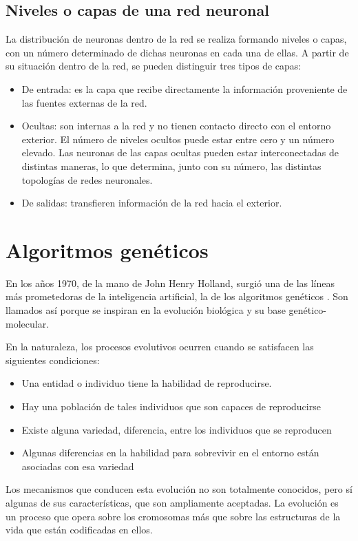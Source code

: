 \subsection{Niveles o capas de una red neuronal}
La distribución de neuronas dentro de la red se realiza formando niveles o
capas, con un número determinado de dichas neuronas en cada una de ellas. A partir de su situación dentro de la red, se pueden distinguir tres tipos de capas:
\begin{itemize}
\item De entrada: es la capa que recibe directamente la información proveniente de las fuentes externas de la red.
\item Ocultas: son internas a la red y no tienen contacto directo con el entorno exterior. El número de niveles ocultos puede estar entre cero y un número elevado. Las neuronas de las capas ocultas pueden estar interconectadas de distintas maneras, lo que determina, junto con su número, las distintas topologías de redes neuronales.
\item De salidas: transfieren información de la red hacia el exterior. 
\end{itemize}

\newpage
\section{Algoritmos genéticos}

En los años 1970, de la mano de John Henry Holland, surgió una de las líneas más prometedoras de la inteligencia artificial, la de los algoritmos genéticos \cite{holland1992adaptation}\cite{goldberg1989algorithmsinsearch}. Son llamados así porque se inspiran en la evolución biológica y su base genético-molecular.

En la naturaleza, los procesos evolutivos ocurren cuando se satisfacen las siguientes condiciones: 
\begin{itemize}
\item Una entidad o individuo tiene la habilidad de reproducirse. 
\item Hay una población de tales individuos que son capaces de reproducirse 
\item Existe alguna variedad, diferencia, entre los individuos que se reproducen 
\item Algunas diferencias en la habilidad para sobrevivir en el entorno están asociadas con esa variedad
\end{itemize}
Los mecanismos que conducen esta evolución no son totalmente conocidos, pero sí algunas de sus características, que son ampliamente aceptadas. La evolución es un proceso que opera sobre los cromosomas más que sobre las estructuras de la vida que están codificadas en ellos.


